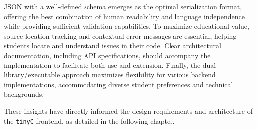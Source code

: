 JSON with a well-defined schema emerges as the optimal serialization format, offering the best combination of human readability and language independence while providing sufficient validation capabilities. To maximize educational value, source location tracking and contextual error messages are essential, helping students locate and understand issues in their code. Clear architectural documentation, including API specifications, should accompany the implementation to facilitate both use and extension. Finally, the dual library/executable approach maximizes flexibility for various backend implementations, accommodating diverse student preferences and technical backgrounds.

These insights have directly informed the design requirements and architecture of the \texttt{tinyC} frontend, as detailed in the following chapter.
